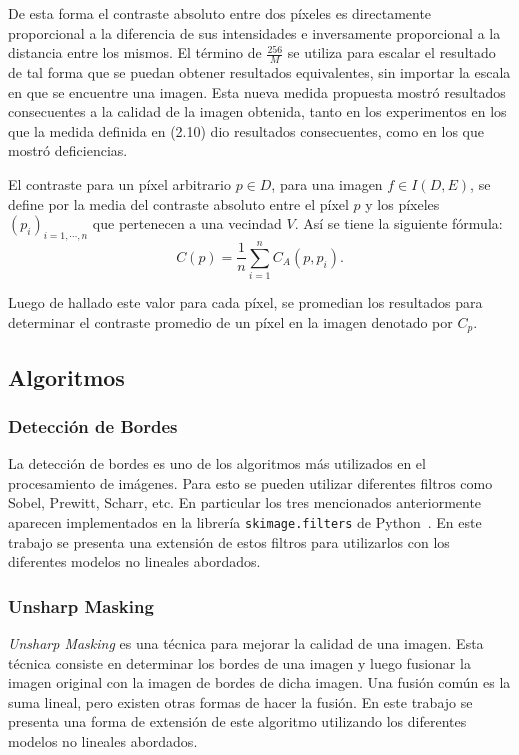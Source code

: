 De esta forma el contraste absoluto entre dos p\'ixeles es directamente proporcional a la diferencia de sus intensidades e inversamente proporcional a la distancia entre los mismos. El t\'ermino de $\frac{256}{M}$ se utiliza para escalar el resultado de tal forma que se puedan obtener resultados equivalentes, sin importar la escala en que se encuentre una imagen. Esta nueva medida propuesta mostr\'o resultados consecuentes a la calidad de la imagen obtenida, tanto en los experimentos en los que la medida definida en (2.10) dio resultados consecuentes, como en los que mostr\'o deficiencias.

El contraste para un píxel arbitrario $p \in D$, para una imagen $f \in I ( D , E )$, se define por la media del contraste absoluto entre el píxel $p$ y los píxeles $( p_i )_{i = 1,\cdots,n}$ que pertenecen a una vecindad $V$. Así se tiene la siguiente fórmula:
\begin{equation}
	\displaystyle C(p)=\frac{1}{n}\sum_{i=1}^{n}C_A(p,p_i).
\end{equation}

Luego de hallado este valor para cada p\'ixel, se promedian los resultados para determinar el contraste promedio de un p\'ixel en la imagen denotado por $C_p$.

\subsection{Algoritmos}

\subsubsection{Detecci\'on de Bordes}

La detecci\'on de bordes es uno de los algoritmos m\'as utilizados en el procesamiento de im\'agenes. Para esto se pueden utilizar diferentes filtros como Sobel, Prewitt, Scharr, etc. En particular los tres mencionados anteriormente aparecen implementados en la librer\'ia \verb|skimage.filters| de Python~\cite{module_filters}. En este trabajo se presenta una extensi\'on de estos filtros para utilizarlos con los diferentes modelos no lineales abordados. 

\subsubsection{Unsharp Masking}

\textit{Unsharp Masking} es una t\'ecnica para mejorar la calidad de una imagen. Esta t\'ecnica consiste en determinar los bordes de una imagen y luego fusionar la imagen original con la imagen de bordes de dicha imagen. Una fusi\'on com\'un es la suma lineal, pero existen otras formas de hacer la fusi\'on. En este trabajo se presenta una forma de extensi\'on de este algoritmo utilizando los diferentes modelos no lineales abordados.

